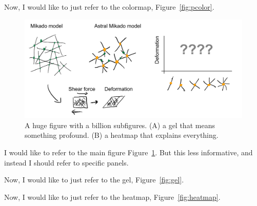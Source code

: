\documentclass[onecolumn,11pt]{article}
\begin{document}
Now, I would like to just refer to the colormap, Figure~\ref{fig:pcolor}.



\clearpage




\begin{figure}[ht]
        \centering
        \includegraphics[width=4.5in]{figures/figJeanJacket.pdf}


        \caption{A huge figure with a billion subfigures. 
        (A) a gel that means something profound. 
        (B) a heatmap that explains everything.}
        \label{fig:main_conclusion}
\end{figure}
    

I would like to refer to the main figure Figure~\ref{fig:main_conclusion}. But this less informative, and instead I should refer to specific panels.

Now, I would like to just refer to the gel, Figure~\ref{fig:gel}.

Now, I would like to just refer to the heatmap, Figure~\ref{fig:heatmap}.







\end{document}
